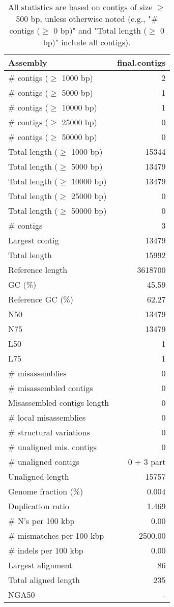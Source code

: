 \documentclass[12pt,a4paper]{article}
\begin{document}
\begin{table}[ht]
\begin{center}
\caption{All statistics are based on contigs of size $\geq$ 500 bp, unless otherwise noted (e.g., "\# contigs ($\geq$ 0 bp)" and "Total length ($\geq$ 0 bp)" include all contigs).}
\begin{tabular}{|l*{1}{|r}|}
\hline
Assembly & final.contigs \\ \hline
\# contigs ($\geq$ 1000 bp) & 2 \\ \hline
\# contigs ($\geq$ 5000 bp) & 1 \\ \hline
\# contigs ($\geq$ 10000 bp) & 1 \\ \hline
\# contigs ($\geq$ 25000 bp) & 0 \\ \hline
\# contigs ($\geq$ 50000 bp) & 0 \\ \hline
Total length ($\geq$ 1000 bp) & 15344 \\ \hline
Total length ($\geq$ 5000 bp) & 13479 \\ \hline
Total length ($\geq$ 10000 bp) & 13479 \\ \hline
Total length ($\geq$ 25000 bp) & 0 \\ \hline
Total length ($\geq$ 50000 bp) & 0 \\ \hline
\# contigs & 3 \\ \hline
Largest contig & 13479 \\ \hline
Total length & 15992 \\ \hline
Reference length & 3618700 \\ \hline
GC (\%) & 45.59 \\ \hline
Reference GC (\%) & 62.27 \\ \hline
N50 & 13479 \\ \hline
N75 & 13479 \\ \hline
L50 & 1 \\ \hline
L75 & 1 \\ \hline
\# misassemblies & 0 \\ \hline
\# misassembled contigs & 0 \\ \hline
Misassembled contigs length & 0 \\ \hline
\# local misassemblies & 0 \\ \hline
\# structural variations & 0 \\ \hline
\# unaligned mis. contigs & 0 \\ \hline
\# unaligned contigs & 0 + 3 part \\ \hline
Unaligned length & 15757 \\ \hline
Genome fraction (\%) & 0.004 \\ \hline
Duplication ratio & 1.469 \\ \hline
\# N's per 100 kbp & 0.00 \\ \hline
\# mismatches per 100 kbp & 2500.00 \\ \hline
\# indels per 100 kbp & 0.00 \\ \hline
Largest alignment & 86 \\ \hline
Total aligned length & 235 \\ \hline
NGA50 & - \\ \hline
\end{tabular}
\end{center}
\end{table}
\end{document}
